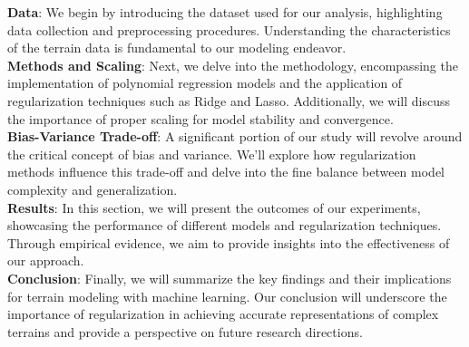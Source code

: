 \documentclass[twoside,11pt]{report}
\begin{document}
\textbf{Data}: We begin by introducing the dataset used for our analysis, highlighting data collection and preprocessing procedures. 
Understanding the characteristics of the terrain data is fundamental to our modeling endeavor.\\
\textbf{Methods and Scaling}: Next, we delve into the methodology, encompassing the implementation of polynomial regression 
models and the application of regularization techniques such as Ridge and Lasso. Additionally, we will discuss the 
importance of proper scaling for model stability and convergence.\\
\textbf{Bias-Variance Trade-off}: A significant portion of our study will revolve around the critical concept of bias and 
variance. We'll explore how regularization methods influence this trade-off and delve into the fine balance between 
model complexity and generalization.\\
\textbf{Results}: In this section, we will present the outcomes of our experiments, showcasing the performance of different 
models and regularization techniques. Through empirical evidence, we aim to provide insights into the effectiveness of our approach.\\
\textbf{Conclusion}: Finally, we will summarize the key findings and their implications for terrain modeling with machine learning. 
Our conclusion will underscore the importance of regularization in achieving accurate representations of complex terrains and 
provide a perspective on future research directions.




%
%     
\end{document}
